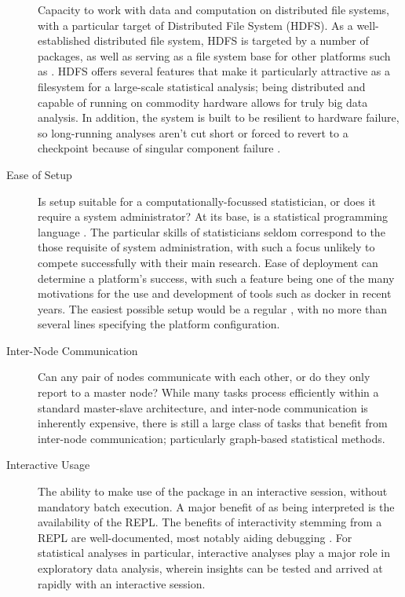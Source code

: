 \begin{description}
		Capacity to work with data and computation on distributed file systems,
		with a particular target of 
		Distributed File System (HDFS).
		As a well-established distributed file system, HDFS is targeted by a number of \R{} packages, as well as serving as a file system base for other platforms such as  \cite{analytics:_rhadoop_wiki} \cite{deltarho:_rhipe}\cite{urbanek20}\cite{zaharia2016apache}.
		HDFS offers several features that make it particularly attractive as a filesystem for a large-scale statistical analysis; being distributed and capable of running on commodity hardware allows for truly big data analysis.
		In addition, the system is built to be resilient to hardware failure, so long-running analyses aren't cut short or forced to revert to a checkpoint because of singular component failure \cite{shvachko2010hadoop}.
	\item[Ease of Setup]
		Is setup suitable for a computationally-focussed statistician, or does
		it require a system administrator?
		At its base, \R{} is a statistical programming language \cite{rcore2020intro}.
		The particular skills of statisticians seldom correspond to the those requisite of system administration, with such a focus unlikely to compete successfully with their main research.
		Ease of deployment can determine a platform's success, with such a feature being one of the many motivations for the use and development of tools such as docker in recent years.
		The easiest possible setup would be a regular , with no more than several lines specifying the platform configuration.
	\item[Inter-Node Communication]
		Can any pair of nodes communicate with each other, or do they only
		report to a master node?
		While many tasks process efficiently within a standard master-slave architecture, and inter-node communication is inherently expensive, there is still a large class of tasks that benefit from inter-node communication\cite{walker1996mpi}; particularly graph-based statistical methods.
	\item[Interactive Usage]
		The ability to make use of the package in an interactive \R{} session,
		without mandatory batch execution.
		A major benefit of \R{} as being interpreted is the availability of the REPL.
		The benefits of interactivity stemming from a REPL are well-documented, most notably aiding debugging \cite{mccarthy1978history}.
		For statistical analyses in particular, interactive analyses play a major role in exploratory data analysis, wherein insights can be tested and arrived at rapidly with an interactive session.

\end{description}

